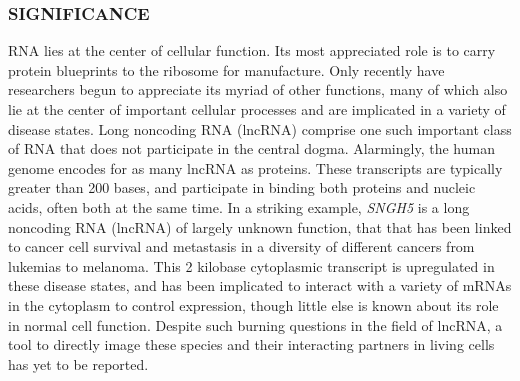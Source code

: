 

\subsubsection*{SIGNIFICANCE}
RNA lies at the center of cellular function. Its most appreciated role is to carry protein blueprints to the ribosome for manufacture.
Only recently have researchers begun to appreciate its myriad of other functions, many of which also lie at the center of important cellular processes and are implicated in a variety of disease states\cite{CechNoncodingRNARevolution2014,DellaRagioneNoncodingRNAschromatin2014,AnastasiadouNoncodingRNAnetworks2018}.
Long noncoding RNA (lncRNA) comprise one such important class of RNA that does not participate in the central dogma\cite{RinnGenomeRegulationLong2012}. Alarmingly, the human genome encodes for as many lncRNA as proteins\cite{Rinntranscriptionalactivityhuman2003,RinnGenomeRegulationLong2012}.
These transcripts are typically greater than 200 bases, and participate in binding both proteins and nucleic acids, often both at the same time\cite{AnastasiadouNoncodingRNAnetworks2018,RinnGenomeRegulationLong2012}.
In a striking example, \textit{SNGH5} is a long noncoding RNA (lncRNA) of largely unknown function, that that has been linked to cancer cell survival and metastasis in a diversity of different cancers from lukemias to melanoma\cite{TanakaRitsukoIntronicU50small2001,DamasSNHG5promotescolorectal2016,ZhaoLongnoncodingRNA2016,HeLncRNASNHG5regulates2017,YanSNHG5promotesproliferation2018,MalncRNASNHG5associated2018,ShenLncRNASNHG5miR26a2018,ZhengLongnoncodingRNA}. This 2 kilobase cytoplasmic transcript is upregulated in these disease states, and has been implicated to interact with a variety of mRNAs in the cytoplasm to control expression, though little else is known about its role in normal cell function. Despite such burning questions in the field of lncRNA, a tool to directly image these species and their interacting partners in living cells has yet to be reported.


